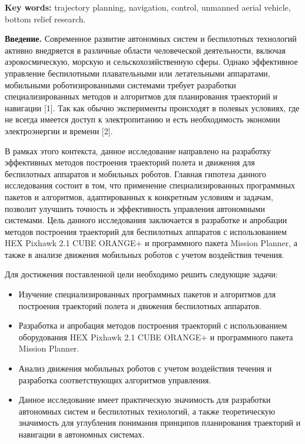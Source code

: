 {\bfseries Key words:} trajectory planning, navigation, control, unmanned
aerial vehicle, bottom relief research.

{\bfseries Введение.} Современное развитие автономных систем и беспилотных
технологий активно внедряется в различные области человеческой
деятельности, включая аэрокосмическую, морскую и сельскохозяйственную
сферы. Однако эффективное управление беспилотными плавательными или
летательными аппаратами, мобильными роботизированными системами требует
разработки специализированных методов и алгоритмов для планирования
траекторий и навигации {[}1{]}. Так как обычно эксперименты происходят в
полевых условиях, где не всегда имеется доступ к электропитанию и есть
необходимость экономии электроэнергии и времени {[}2{]}.

В рамках этого контекста, данное исследование направлено на разработку
эффективных методов построения траекторий полета и движения для
беспилотных аппаратов и мобильных роботов. Главная гипотеза данного
исследования состоит в том, что применение специализированных
программных пакетов и алгоритмов, адаптированных к конкретным условиям и
задачам, позволит улучшить точность и эффективность управления
автономными системами. Цель данного исследования заключается в
разработке и апробации методов построения траекторий для беспилотных
аппаратов с использованием HEX Pixhawk 2.1 CUBE ORANGE+ и программного
пакета Mission Planner, а также в анализе движения мобильных роботов с
учетом воздействия течения.

Для достижения поставленной цели необходимо решить следующие задачи:

\begin{itemize}
\item
  Изучение специализированных программных пакетов и алгоритмов для
  построения траекторий полета и движения беспилотных аппаратов.
\item
  Разработка и апробация методов построения траекторий с использованием
  оборудования HEX Pixhawk 2.1 CUBE ORANGE+ и программного пакета
  Mission Planner.
\item
  Анализ движения мобильных роботов с учетом воздействия течения и
  разработка соответствующих алгоритмов управления.
\item
  Данное исследование имеет практическую значимость для разработки
  автономных систем и беспилотных технологий, а также теоретическую
  значимость для углубления понимания принципов планирования траекторий
  и навигации в автономных системах.
\end{itemize}

